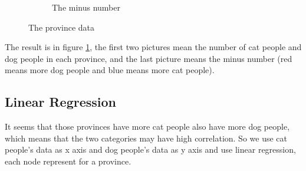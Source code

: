 \documentclass[12pt]{article}
\begin{document}
\begin{figure}[h!]
\begin{subfigure}[b]{0.3\linewidth}
  \caption{The minus number}
  \end{subfigure}
  \caption{The province data}
  \label{fig:prov}
\end{figure}

The result is in figure \ref{fig:prov}, the first two pictures mean the number of cat people and dog people in each province, and the last picture means the minus number (red means more dog people and blue means more cat people).

\subsection{Linear Regression}

It seems that those provinces have more cat people also have more dog people, which means that the two categories may have high correlation. So we use cat people's data as x axis and dog people's data as y axis and use linear regression, each node represent for a province.
\end{document}
